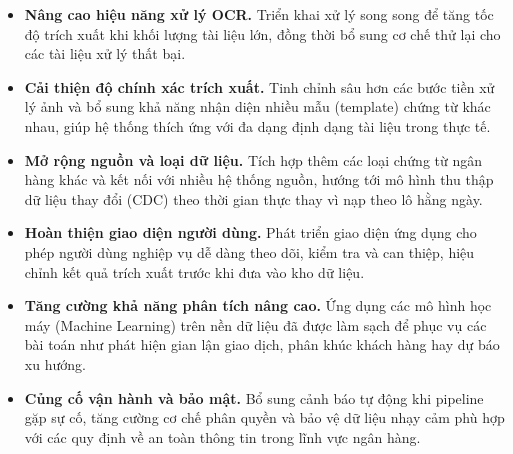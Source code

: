 \documentclass[oneside, a4paper]{book}
\theoremstyle{plain}
\theoremstyle{definition}
\theoremstyle{remark}
\begin{document}
\begin{itemize}
    \item \textbf{Nâng cao hiệu năng xử lý OCR.} Triển khai xử lý song song để tăng tốc độ trích xuất khi khối lượng tài liệu lớn, đồng thời bổ sung cơ chế thử lại cho các tài liệu xử lý thất bại.

    \item \textbf{Cải thiện độ chính xác trích xuất.} Tinh chỉnh sâu hơn các bước tiền xử lý ảnh và bổ sung khả năng nhận diện nhiều mẫu (template) chứng từ khác nhau, giúp hệ thống thích ứng với đa dạng định dạng tài liệu trong thực tế.

    \item \textbf{Mở rộng nguồn và loại dữ liệu.} Tích hợp thêm các loại chứng từ ngân hàng khác và kết nối với nhiều hệ thống nguồn, hướng tới mô hình thu thập dữ liệu thay đổi (CDC) theo thời gian thực thay vì nạp theo lô hằng ngày.

    \item \textbf{Hoàn thiện giao diện người dùng.} Phát triển giao diện ứng dụng cho phép người dùng nghiệp vụ dễ dàng theo dõi, kiểm tra và can thiệp, hiệu chỉnh kết quả trích xuất trước khi đưa vào kho dữ liệu.

    \item \textbf{Tăng cường khả năng phân tích nâng cao.} Ứng dụng các mô hình học máy (Machine Learning) trên nền dữ liệu đã được làm sạch để phục vụ các bài toán như phát hiện gian lận giao dịch, phân khúc khách hàng hay dự báo xu hướng.

    \item \textbf{Củng cố vận hành và bảo mật.} Bổ sung cảnh báo tự động khi pipeline gặp sự cố, tăng cường cơ chế phân quyền và bảo vệ dữ liệu nhạy cảm phù hợp với các quy định về an toàn thông tin trong lĩnh vực ngân hàng.
\end{itemize}
\end{document}
